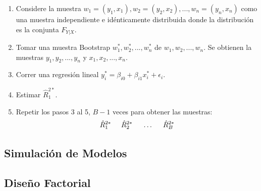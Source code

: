 \begin{enumerate}
	\item Considere la muestra $ w_{1} = (y_{1}, x_{1}),  w_{2} = (y_{2}, x_{2}), ..., w_{n} = (y_{n}, x_{n})$ como una muestra independiente e idénticamente distribuida donde la distribución es la conjunta $ F_{Y|X} $.
	\item  Tomar una muestra Bootstrap  $ w^{*}_{1}, w^{*}_{2},...,  w^{*}_{n} $ de $w_{1}, w_{2},...,  w_{n} $. Se obtienen la muestras  $y_{1}, y_{2},...,  y_{n} $ y  $x_{1}, x_{2},...,  x_{n} $.
	\item Correr una regresión lineal $ y^{*}_{i} = \beta_{i0} +\beta_{i1}x_{i}^{*} + \epsilon_{i} $.
	\item Estimar  $ \hat{R}^{2*}_{1} $.
	\item  Repetir los pasos 3 al 5, $B - 1$ veces para obtener las muestras: 
	\[
	\hat{R}^{2*}_{1} \hspace{.5cm} \hat{R}^{2*}_{2} \hspace{.5cm} \dots \hspace{.5cm} \hat{R}^{2*}_{B}
	\]
\end{enumerate}






\subsection{Simulación de Modelos}

\subsection{Diseño Factorial}
